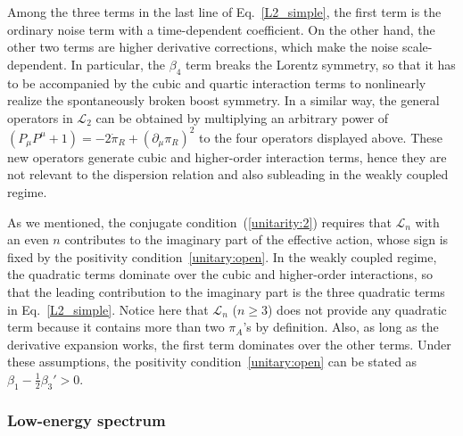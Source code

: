 \documentclass[a4paper,11pt]{article}
\begin{document}
\medskip
Among the three terms in the last line of Eq.~\eqref{L2_simple}, 
the first term is the ordinary noise term with a time-dependent coefficient. 
On the other hand, the other two terms are higher derivative corrections, 
which make the noise scale-dependent. 
In particular, the $\beta_4$ term breaks the Lorentz symmetry, 
so that it has to be accompanied by the cubic and quartic interaction terms 
to nonlinearly realize the spontaneously broken boost symmetry.
In a similar way, the general operators in $\mathcal{L}_2$ can be obtained 
by multiplying an arbitrary power of 
$(P_\mu P^\mu+1)=-2\dot{\pi}_R+(\partial_\mu\pi_R)^2$ to the four operators 
displayed above. 
These new operators generate cubic and higher-order interaction terms, 
hence they are not relevant to the dispersion relation and also subleading 
in the weakly coupled regime.

\medskip
As we mentioned, the conjugate condition~(\ref{unitarity:2}) requires that $\mathcal{L}_n$ with an even $n$ contributes to the imaginary part of the effective action, whose sign is fixed by the positivity condition~\eqref{unitary:open}. In the weakly coupled regime, the quadratic terms dominate over the cubic and higher-order interactions, so that the leading contribution to the imaginary part is the three quadratic terms in Eq.~\eqref{L2_simple}. Notice here that $\mathcal{L}_n$ ($n\geq3$) does not provide any quadratic term because it contains more than two $\pi_A$'s by definition. Also, as long as the derivative expansion works, the first term dominates over the other terms. Under these assumptions, the positivity condition~\eqref{unitary:open} can be stated as $\beta_1-\tfrac{1}{2}\beta_3'>0$.



\subsubsection{Low-energy spectrum}
\end{document}
